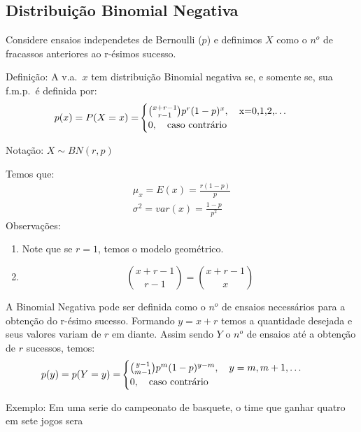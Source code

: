       \subsection{Distribuição Binomial Negativa}
      \begin{description}
        \item  Considere ensaios independetes de Bernoulli ($p$) e definimos $X$ como o $n^o$ 
      de fracassos anteriores ao r-ésimos sucesso.

    \item{Definição}: A v.a.\ $x$ tem distribuição Binomial negativa se, e somente se,
      sua f.m.p.\ é definida por:
      \begin{align}
        p(x)=P(X=x)=&
        \begin{cases}
          \binom{x+r-1}{r-1} p^r (1-p)^x, \text{\quad x=0,1,2,\dots} \\
          0, \text{\quad caso contrário}
        \end{cases}
      \end{align}
    \begin{center}Notação: $X \mathtt{\sim}BN(r,p)$\end{center}
      Temos que: 
      \begin{align}
        \mu_{x}=E(x)=\frac{r(1-p)}{p} \\
        \sigma^2 = var(x)=\frac{1-p}{p^2}
      \end{align}
      Observações: 
      \begin{enumerate}
        \item Note que se $r=1$, temos o modelo geométrico.
        \item $$\binom{x+r-1}{r-1} = \binom{x+r-1}{x}$$
      \end{enumerate}
      A Binomial Negativa pode ser definida como o $n^o$ de ensaios necessários para 
      a obtenção do r-ésimo sucesso. Formando $y=x+r$ temos a quantidade desejada e 
      seus valores variam de $r$ em diante. Assim sendo $Y$ o $n^o$ de ensaios até 
      a obtenção de $r$ sucessos, temos: 
      \begin{align}
        p(y)=p(Y=y)=&\begin{cases}
          \binom{y-1}{m-1}p^m(1-p)^{y-m}, \text{\quad }y=m,m+1,\dots \\
          0, \text{\quad caso contrário}
        \end{cases}
      \end{align}
    \item{Exemplo}: Em uma serie do campeonato de basquete, o time que ganhar quatro em sete jogos sera

\end{description}
